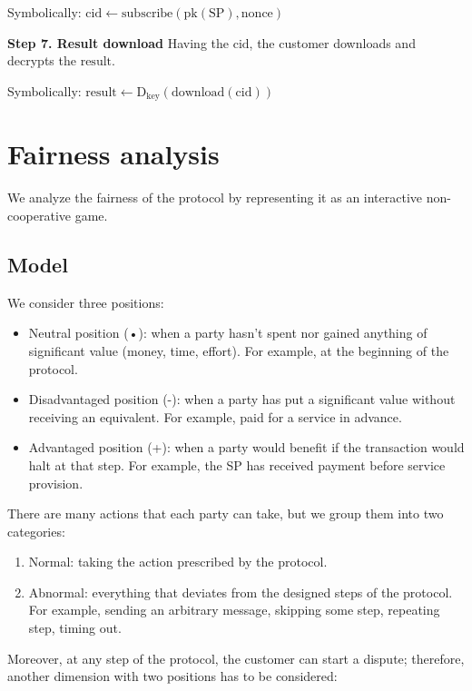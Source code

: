 \documentclass{ieeeaccess}
\begin{document}
Symbolically: 
$
\mathrm{cid} \gets \mathrm{subscribe}(\mathrm{pk}(\mathrm{SP}), \mathrm{nonce})
$

\noindent \textbf
{Step 7. Result download}\label{step-7-results-download} 
Having the $\mathrm{cid}$, the customer downloads and decrypts the $\mathrm{result}$.

Symbolically: 
$
\mathrm{result} \gets \mathrm{D}_{\mathrm{key}}(\mathrm{download}(\mathrm{cid}))
$


\section{Fairness analysis}\label{sec:fairness-analysis}

We analyze the fairness of the protocol by representing it as an interactive non-cooperative game.

\subsection{Model}\label{model}
We consider three positions:

\begin{itemize}
\item
  Neutral position (•): when a party hasn't spent nor gained anything of significant value (money, time, effort). For example, at the beginning of the protocol.
\item
  Disadvantaged position (-): when a party has put a significant value without receiving an equivalent. For example, paid for a service in advance.
\item
  Advantaged position (+): when a party would benefit if the transaction would halt at that step. For example, the SP has received payment before service provision.
\end{itemize}

There are many actions that each party can take, but we group them into two categories:

\begin{enumerate}
\def\labelenumi{\arabic{enumi}.}

\item
  Normal: taking the action prescribed by the protocol.
\item
  Abnormal: everything that deviates from the designed steps of the protocol. For example, sending an arbitrary message, skipping some step, repeating step, timing out.
\end{enumerate}

Moreover, at any step of the protocol, the customer can start a dispute; therefore, another dimension with two positions has to be considered:
\end{document}
